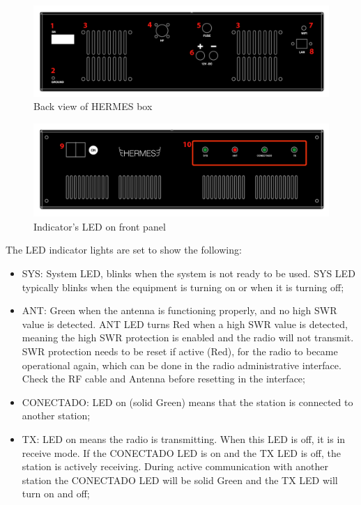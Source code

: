\documentclass[11pt,a4paper]{article}
\begin{document}
\begin{figure}[!ht]
\includegraphics[width=1\textwidth]{pictures/traseiro.png}
\caption{Back view of HERMES box}
\label{fig:backview}
\end{figure}

\begin{figure}[!ht]
\includegraphics[width=1\textwidth]{pictures/front.png}
\caption{Indicator's LED on front panel}
\label{fig:frontview}
\end{figure}
The LED indicator lights are set to show the following:
\begin{itemize}
    \item SYS: System LED, blinks when the system is not ready to be used. SYS LED typically blinks when the equipment is turning on or when it is turning off;
    \item ANT: Green when the antenna is functioning properly, and no high SWR value is detected. ANT LED turns Red when a high SWR value is detected, meaning the high SWR protection is enabled and the radio will not transmit. SWR protection needs to be reset if active (Red), for the radio to became operational again, which can be done in the radio administrative interface. Check the RF cable and Antenna before resetting in the interface;
    \item CONECTADO: LED on (solid Green) means that the station is connected to another station;
    \item TX: LED on means the radio is transmitting. When this LED is off, it is in receive mode. If the CONECTADO LED is on and the TX LED is off, the station is actively receiving. During active communication with another station the CONECTADO LED will be solid Green and the TX LED will turn on and off;
\end{itemize}
\end{document}
